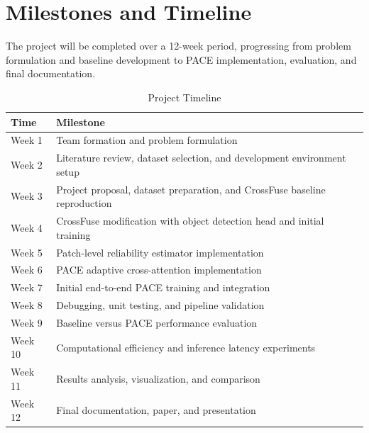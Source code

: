 \documentclass[conference]{IEEEtran}
\begin{document}

\section{Milestones and Timeline}

The project will be completed over a 12-week period, progressing from problem formulation and baseline development to PACE implementation, evaluation, and final documentation.

\renewcommand{\arraystretch}{1.15}
\begin{table}[H]
\centering
\caption{Project Timeline}
\label{tab:timeline}
\begin{tabular}{p{}p{}}
\toprule
\textbf{Time} & \textbf{Milestone} \\
\midrule
Week 1 & Team formation and problem formulation \\
Week 2 & Literature review, dataset selection, and development environment setup \\
Week 3 & Project proposal, dataset preparation, and CrossFuse baseline reproduction \\
Week 4 & CrossFuse modification with object detection head and initial training \\
Week 5 & Patch-level reliability estimator implementation \\
Week 6 & PACE adaptive cross-attention implementation \\
Week 7 & Initial end-to-end PACE training and integration \\
Week 8 & Debugging, unit testing, and pipeline validation \\
Week 9 & Baseline versus PACE performance evaluation \\
Week 10 & Computational efficiency and inference latency experiments \\
Week 11 & Results analysis, visualization, and comparison \\
Week 12 & Final documentation, paper, and presentation \\
\bottomrule
\end{tabular}
\end{table}



\color{black}

\color{black}
\end{document}
